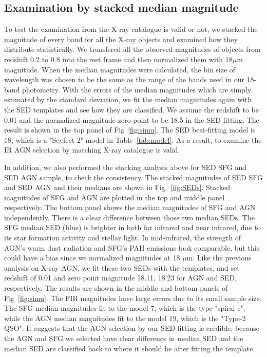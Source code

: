 \documentclass[a4paper,fleqn,usenatbib]{mnras}
\begin{document}
\subsection{Examination by stacked median magnitude}
To test the examination from the X-ray catalogue is valid or not, we stacked the magnitude of every band for all the X-ray objects and examined how they distribute statistically. We transfered all the observed magnitudes of objects from redshift 0.2 to 0.8 into the rest frame and then normalized them with 18$\mu$m magnitude. When the median magnitudes were calculated, the bin size of wavelength was chosen to be the same as the range of the bands used in our 18-band photometry. With the errors of the median magnitudes which are simply estimated by the standard deviation, we fit the median magnitudes again with the SED templates and see how they are classified. We assume the redshift to be 0.01 and the normalized magnitude zero point to be 18.5 in the SED fitting. The result is shown in the top panel of Fig~\ref{fig:simu}. The SED best-fitting model is 18, which is a "Seyfect 2" model in Table~\ref{tab:model}. As a result, to examine the IR AGN selection by matching X-ray catalogue is valid. 

In addition, we also performed the stacking analysis above for SED SFG and SED AGN sample, to check the consistency. The stacked magnitudes of SED SFG and SED AGN and their medians are shown in Fig.~\ref{fig:SEDs}. Stacked magnitudes of SFG and AGN are plotted in the top and middle panel respectively. The bottom panel shows the median magnitudes of SFG and AGN independently. There is a clear difference between those two median SEDs. The SFG median SED (blue) is brighter in both far infrared and near infrared, due to its star formation activity and stellar light. In mid-infrared, the strength of AGN's warm dust radiation and SFG's PAH emissions look comparable, but this could have a bias since we normalized magnitudes at 18 $\mu$m. Like the previous analysis on X-ray AGN, we fit these two SEDs with the templates, and set redshift of 0.01 and zero point magnitude 18.11, 18.23 for AGN and SED, respectively. The results are shown in the middle and bottom panels of Fig~\ref{fig:simu}. The FIR magnitudes have large errors due to its small sample size. The SFG median magnitudes fit to the model 7, which is the type "spiral c", while the AGN median magnitudes fit to the model 19, which is the "Type-2 QSO". It suggests that the AGN selection by our SED fitting is credible, because the AGN and SFG we selected have clear difference in median SED and the median SED are classified back to where it should be after fitting the template.
\end{document}
